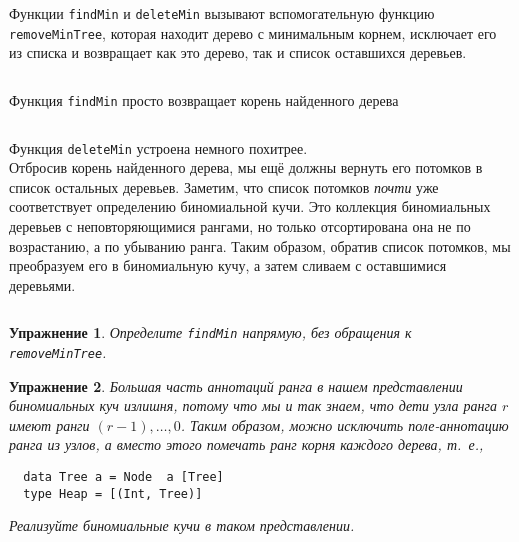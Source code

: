 \documentclass[aspectratio=169
  , xcolor={svgnames}
  , hyperref={ colorlinks,citecolor=DeepPink4
             , linkcolor=DarkRed,urlcolor=DarkBlue}
  , russian
  ]{beamer}
\theoremstyle{exerciseStyle1}
\newtheorem{exercise}{\textbf{Упражнение}}[section]
\begin{document}
\begin{frame}[fragile]{}
Функции \lstinline!findMin! и \lstinline!deleteMin! вызывают
вспомогательную функцию \lstinline!removeMinTree!, которая находит
дерево с минимальным корнем, исключает его из списка и возвращает как
это дерево, так и список оставшихся деревьев.

\inputminted[firstline=27,lastline=31] {haskell}{code/BinomialHeap.lhs}

Функция \lstinline!findMin! просто возвращает корень найденного дерева

\inputminted[firstline=39,lastline=40,gobble=2] {haskell}{code/BinomialHeap.lhs}

\end{frame}

\begin{frame}[fragile]{}
Функция \lstinline!deleteMin! устроена немного похитрее. \\

 Отбросив
корень найденного дерева, мы ещё должны вернуть его потомков в список
остальных деревьев. Заметим, что список потомков \emph{почти} уже
соответствует определению биномиальной кучи. Это коллекция
биномиальных деревьев с неповторяющимися рангами, но только
отсортирована она не по возрастанию, а по убыванию ранга. Таким
образом, обратив список потомков, мы преобразуем его в биномиальную
кучу, а затем сливаем с оставшимися деревьями.

\inputminted[firstline=42,lastline=43] {haskell}{code/BinomialHeap.lhs}
\end{frame}

\ifanswers
\begin{frame}[fragile]{}
\begin{exercise}\label{ex:3.5}
  Определите \lstinline!findMin! напрямую, без обращения к \lstinline!removeMinTree!.
\end{exercise}

\begin{exercise}\label{ex:3.6}
  Большая часть аннотаций ранга в нашем представлении биномиальных куч
  излишня, потому что мы и так знаем, что дети узла ранга $r$ имеют
  ранги $(r\!-\!1), \ldots, 0$. Таким образом, можно исключить
  поле-аннотацию ранга из узлов, а вместо этого помечать ранг корня
  каждого дерева, т.~е.,
  \begin{verbatim}
  data Tree a = Node  a [Tree]
  type Heap = [(Int, Tree)]
  \end{verbatim}
  Реализуйте биномиальные кучи в таком представлении.
\end{exercise}
\end{frame}
\end{document}
